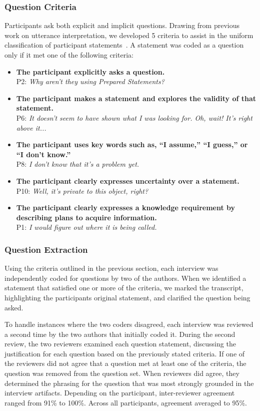 \documentclass[conference]{IEEEtran}
\begin{document}
\subsubsection{Question Criteria}
Participants ask both explicit and implicit questions. 
Drawing from previous work on utterance interpretation, we developed 5 criteria to assist in the uniform classification of participant statements~\cite{letovsky1987cognitive}. 
A statement was coded as a question only if it met one of the following criteria:

\begin{itemize}
\item \textbf{The participant explicitly asks a question.}
\\ P2: \textit{Why aren't they using Prepared Statements?}
\item \textbf{The participant makes a statement and explores the validity of that statement.}
\\ P6: \textit{It doesn't seem to have shown what I was looking for. Oh, wait! It's right above it...}
\item \textbf{The participant uses key words such as, ``I assume,'' ``I guess,'' or ``I don't know.''}
\\ P8: \textit{I don't know that it's a problem yet.}
\item \textbf{The participant clearly expresses uncertainty over a statement.}
\\ P10: \textit{Well, it's private to this object, right?}
\item \textbf{The participant clearly expresses a knowledge requirement by describing plans to acquire information.}
\\ P1: \textit{I would figure out where it is being called.}

\end{itemize}

\subsubsection{Question Extraction}
Using the criteria outlined in the previous section, each interview was independently coded for questions by two of the authors. 
When we identified a statement that satisfied one or more of the criteria, we marked the transcript, highlighting the participants original statement, and clarified the question being asked.

To handle instances where the two coders disagreed, each interview was reviewed a second time by the two authors that initially coded it.
During the second review, the two reviewers examined each question statement, discussing the justification for each question based on the previously stated criteria.
If one of the reviewers did not agree that a question met at least one of the criteria, the question was removed from the question set. 
When reviewers did agree, they determined the phrasing for the question that was most strongly grounded in the interview artifacts. 
Depending on the participant, inter-reviewer agreement ranged from 91\% to 100\%. Across all participants, agreement averaged to 95\%.
\end{document}
